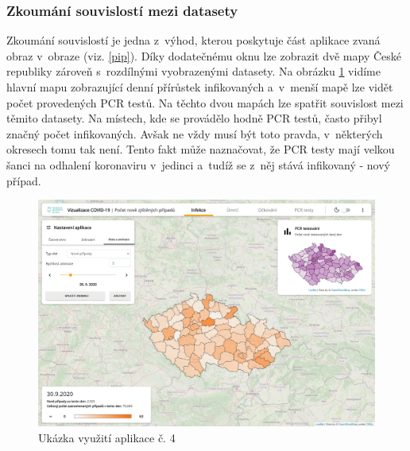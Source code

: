 \subsubsection*{Zkoumání souvislostí mezi datasety}

Zkoumání souvislostí je jedna z~výhod, kterou poskytuje část aplikace zvaná obraz v~obraze (viz. \ref{pip}). Díky dodatečnému oknu lze zobrazit dvě mapy České republiky zároveň s~rozdílnými vyobrazenými datasety. Na obrázku \ref{fig:Showcase4} vidíme hlavní mapu zobrazující denní přírůstek infikovaných a~v~menší mapě lze vidět počet provedených PCR testů. Na těchto dvou mapách lze spatřit souvislost mezi těmito datasety. Na místech, kde se provádělo hodně PCR testů, často přibyl značný počet infikovaných. Avšak ne vždy musí být toto pravda, v~některých okresech tomu tak není. Tento fakt může naznačovat, že PCR testy mají velkou šanci na odhalení koronaviru v~jedinci a~tudíž se z~něj stává infikovaný - nový případ.

\vspace*{0.5in}
\begin{figure}[h]
	\centering
	\includegraphics[width=1\textwidth]{Pictures/showcase4.png}
	\caption{Ukázka využití aplikace č. 4}
	\label{fig:Showcase4}
\end{figure}

\endinput